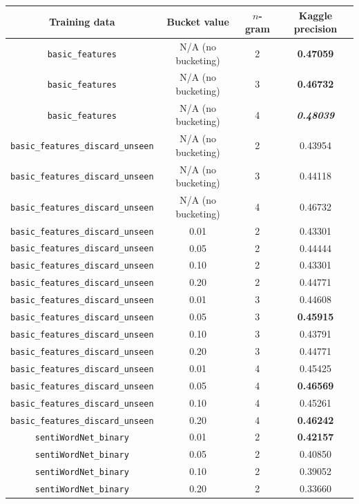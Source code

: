 \documentclass{article}
\begin{document}
{\small
\begin{tabular}{|c|c|c|c|}\hline
Training data & Bucket value & $n$-gram & Kaggle precision\\\hline
\texttt{basic\_features} & N/A (no bucketing) & 2 & \textbf{0.47059}\\\hline
\texttt{basic\_features} & N/A (no bucketing) & 3 & \textbf{0.46732}\\\hline
\texttt{basic\_features} & N/A (no bucketing) & 4 & \textbf{\textit{0.48039}}\\\hline\hline
\texttt{basic\_features\_discard\_unseen} & N/A (no bucketing) & 2 & 0.43954\\\hline
\texttt{basic\_features\_discard\_unseen} & N/A (no bucketing) & 3 & 0.44118\\\hline
\texttt{basic\_features\_discard\_unseen} & N/A (no bucketing) & 4 & 0.46732\\\hline
\texttt{basic\_features\_discard\_unseen} & 0.01 & 2 & 0.43301\\
\texttt{basic\_features\_discard\_unseen} & 0.05 & 2 & 0.44444\\
\texttt{basic\_features\_discard\_unseen} & 0.10 & 2 & 0.43301\\
\texttt{basic\_features\_discard\_unseen} & 0.20 & 2 & 0.44771\\\hline
\texttt{basic\_features\_discard\_unseen} & 0.01 & 3 & 0.44608\\
\texttt{basic\_features\_discard\_unseen} & 0.05 & 3 & \textbf{0.45915}\\
\texttt{basic\_features\_discard\_unseen} & 0.10 & 3 & 0.43791\\
\texttt{basic\_features\_discard\_unseen} & 0.20 & 3 & 0.44771\\\hline
\texttt{basic\_features\_discard\_unseen} & 0.01 & 4 & 0.45425\\
\texttt{basic\_features\_discard\_unseen} & 0.05 & 4 & \textbf{0.46569}\\
\texttt{basic\_features\_discard\_unseen} & 0.10 & 4 & 0.45261\\
\texttt{basic\_features\_discard\_unseen} & 0.20 & 4 & \textbf{0.46242}\\\hline\hline
\texttt{sentiWordNet\_binary} & 0.01 & 2 & \textbf{0.42157}\\
\texttt{sentiWordNet\_binary} & 0.05 & 2 & 0.40850\\
\texttt{sentiWordNet\_binary} & 0.10 & 2 & 0.39052\\
\texttt{sentiWordNet\_binary} & 0.20 & 2 & 0.33660\\\hline

\end{tabular}}
\end{document}
